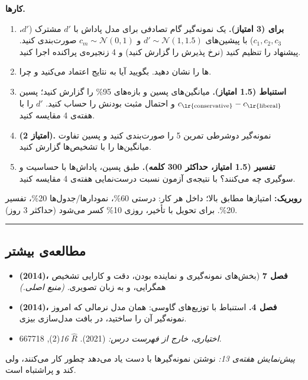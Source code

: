 \textbf{کارها.}

\begin{enumerate}
\def\labelenumi{\arabic{enumi}.}
\tightlist
\item
  \textbf{ برای  (3 امتیاز).} یک نمونه‌گیر
   گام تصادفی برای مدل پاداش با \(d'\) مشترک (\(d'\)،
  \(c_1, c_2, c_3\)) با پیشین‌های \(d' \sim \mathcal{N}(1, 1.5)\) و
  \(c_m \sim \mathcal{N}(0, 1)\) صورت‌بندی کنید. پیشنهاد را تنظیم کنید
  (نرخ پذیرش را گزارش کنید) و 4 زنجیره‌ی پراکنده اجرا کنید.
\item
  ها را نشان دهید. بگویید آیا به نتایج اعتماد می‌کنید و
  چرا.
\item
  \textbf{استنباط (1.5 امتیاز).} میانگین‌های پسین و بازه‌های 95\% را گزارش
  کنید؛ پسین \(c_{\text{\lr{conservative}}} - c_{\text{\lr{liberal}}}\) و احتمال
  مثبت بودنش را حساب کنید. \(d'\) را با  هفته‌ی 4 مقایسه کنید.
\item
  \textbf{ (2 امتیاز).} نمونه‌گیر  دوشرطی تمرین 5 را
  صورت‌بندی کنید و پسین تفاوت میانگین‌ها را با تشخیص‌ها گزارش کنید.
\item
  \textbf{تفسیر (1.5 امتیاز، حداکثر 300 کلمه).} طبق پسین، پاداش‌ها با
  حساسیت و سوگیری چه می‌کنند؟ با نتیجه‌ی آزمون نسبت درست‌نمایی هفته‌ی 4
  مقایسه کنید.
\end{enumerate}

\textbf{روبریک:} امتیازها مطابق بالا؛ داخل هر کار: درستی 60\%،
نمودارها/جدول‌ها 20\%، تفسیر 20\%. برای تحویل با تأخیر، روزی 10\% کسر
می‌شود (حداکثر 3 روز).

\begin{center}\rule{0.5\linewidth}{0.5pt}\end{center}

\subsection{مطالعه‌ی بیشتر}

\begin{itemize}
\tightlist
\item
  \textbf{ (2014)، فصل 7} (بخش‌های نمونه‌گیری  و
  نماینده بودن، دقت و کارایی  تشخیص همگرایی،  و
   به زبان تصویری. \emph{(منبع اصلی.)}
\item
  \textbf{ \lr{\&}  (2014)، فصل 4.} استنباط با
  توزیع‌های گاوسی: همان مدل نرمالی که امروز نمونه‌گیر  آن را
  ساختید، در بافت مدل‌سازی بیزی.
\item
  \emph{اختیاری، خارج از فهرست درس:}  \lr{\&}  (2021).
  \(\hat R\)  \emph{ 16}(2), 667\lr{--}718.
\end{itemize}

\emph{پیش‌نمایش هفته‌ی 13:} نوشتن نمونه‌گیرها با دست یاد می‌دهد چطور کار
می‌کنند، ولی کند و پراشتباه است.
